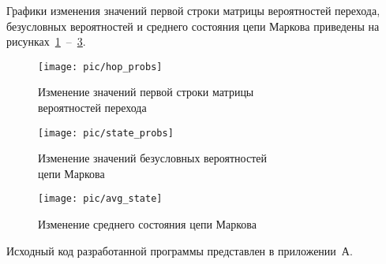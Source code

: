 \newpage

Графики изменения значений первой строки матрицы вероятностей перехода,
безусловных вероятностей и среднего состояния цепи Маркова приведены на
рисунках~\ref{pic:hop_probs}~--~\ref{pic:avg_state}.

\begin{figure}[h!]
  \centering
  \texttt{[image: pic/hop\_probs]}
  \caption{Изменение значений первой строки матрицы \\ вероятностей перехода}
  \label{pic:hop_probs}
\end{figure}

\begin{figure}[h!]
  \centering
  \texttt{[image: pic/state\_probs]}
  \caption{Изменение значений безусловных вероятностей \\ цепи Маркова}
  \label{pic:state_probs}
\end{figure}

\newpage

\begin{figure}[h!]
  \centering
  \texttt{[image: pic/avg\_state]}
  \caption{Изменение среднего состояния цепи Маркова}
  \label{pic:avg_state}
\end{figure}

Исходный код разработанной программы представлен в приложении~А.
